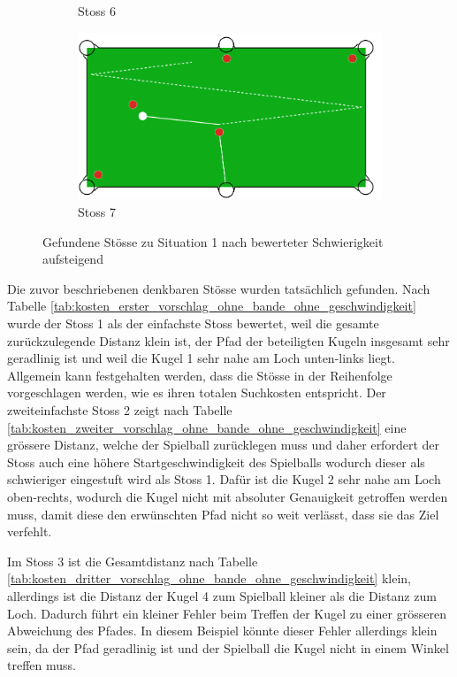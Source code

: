 \begin{figure}[h!]
\begin{subfigure}[b]{0.3\textwidth}
        \caption{Stoss 6}
        \label{fig:situation_1_solution_6}
    \end{subfigure}
    \hfill
    \begin{subfigure}[b]{0.3\textwidth}
        \centering
        \includegraphics[width=1.0\linewidth]{../common/04_results/resources/simple_search/situation_diverse_solution_7.PNG}
        \caption{Stoss 7}
        \label{fig:situation_1_solution_7}
    \end{subfigure}
    \caption{Gefundene Stösse zu Situation 1 nach bewerteter Schwierigkeit aufsteigend}
    \label{fig:situation_1_solutions}
\end{figure}

Die zuvor beschriebenen denkbaren Stösse wurden tatsächlich gefunden.
Nach Tabelle \ref{tab:kosten_erster_vorschlag_ohne_bande_ohne_geschwindigkeit} wurde der Stoss 1 als der einfachste Stoss
bewertet, weil die gesamte zurückzulegende Distanz klein ist,
der Pfad der beteiligten Kugeln insgesamt sehr geradlinig ist und weil die Kugel 1 sehr nahe am Loch unten-links liegt.
Allgemein kann festgehalten werden, dass die Stösse in der Reihenfolge vorgeschlagen werden, wie es ihren totalen Suchkosten
entspricht.
Der zweiteinfachste Stoss 2 zeigt nach Tabelle \ref{tab:kosten_zweiter_vorschlag_ohne_bande_ohne_geschwindigkeit}
eine grössere Distanz, welche der Spielball zurücklegen muss und daher erfordert
der Stoss auch eine höhere Startgeschwindigkeit des Spielballs wodurch dieser als schwieriger eingestuft wird als Stoss 1.
Dafür ist die Kugel 2 sehr nahe am Loch oben-rechts, wodurch die Kugel nicht mit absoluter Genauigkeit getroffen werden
muss, damit diese den erwünschten Pfad nicht so weit verlässt, dass sie das Ziel verfehlt.

Im Stoss 3 ist die Gesamtdistanz nach Tabelle \ref{tab:kosten_dritter_vorschlag_ohne_bande_ohne_geschwindigkeit} klein,
allerdings ist die Distanz der Kugel 4 zum Spielball kleiner als die Distanz zum Loch.
Dadurch führt ein kleiner Fehler beim Treffen der Kugel zu einer grösseren Abweichung des Pfades.
In diesem Beispiel könnte dieser Fehler allerdings klein sein, da der Pfad geradlinig ist und der Spielball die Kugel
nicht in einem Winkel treffen muss.

